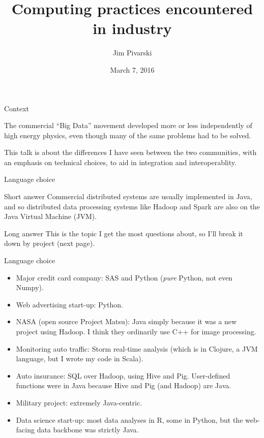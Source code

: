 \documentclass{beamer}
\title[2016-03-07-rootteam-hadoop]{Computing practices encountered in industry}
\author{Jim Pivarski}
\institute{Princeton University -- DIANA}
\date{March 7, 2016}
\begin{document}
\begin{frame}
  \titlepage
\end{frame}

\begin{frame}{Context}

\begin{block}{}
The commercial ``Big Data'' movement developed more or less independently of high energy physics, even though many of the same problems had to be solved.
\end{block}

\begin{block}{}
This talk is about the differences I have seen between the two communities, with an emphasis on technical choices, to aid in integration and interoperablity.
\end{block}
\end{frame}

\begin{frame}{Language choice}
\begin{block}{Short answer}
Commercial distributed systems are usually implemented in Java, and so distributed data processing systems like Hadoop and Spark are also on the Java Virtual Machine (JVM).
\end{block}

\begin{block}{Long answer}
This is the topic I get the most questions about, so I'll break it down by project (next page).
\end{block}
\end{frame}

\begin{frame}{Language choice}
\begin{itemize}
\item Major credit card company: SAS and Python ({\it pure} Python, not even Numpy).

\item Web advertising start-up: Python.

\item NASA (open source Project Matsu): Java simply because it was a new project using Hadoop. I think they ordinarily use C++ for image processing.

\item Monitoring auto traffic: Storm real-time analysis (which is in Clojure, a JVM language, but I wrote my code in Scala).

\item Auto insurance: SQL over Hadoop, using Hive and Pig. User-defined functions were in Java because Hive and Pig (and Hadoop) are Java.

\item Military project: extremely Java-centric.

\item Data science start-up: most data analyses in R, some in Python, but the web-facing data backbone was strictly Java.
\end{itemize}
\end{frame}
\end{document}
